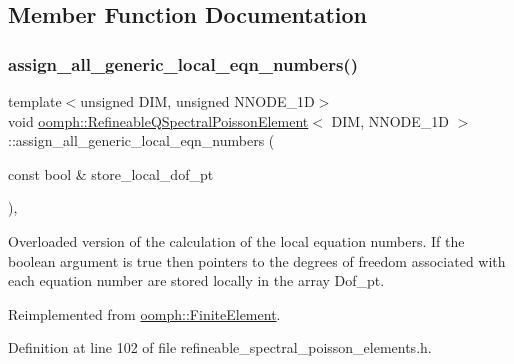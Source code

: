 \subsection{Member Function Documentation}
\mbox{\label{classoomph_1_1RefineableQSpectralPoissonElement_ac6e937b985ab8af65695dd502f48ab43}} 
\subsubsection{\texorpdfstring{assign\+\_\+all\+\_\+generic\+\_\+local\+\_\+eqn\+\_\+numbers()}{assign\_all\_generic\_local\_eqn\_numbers()}}
{\footnotesize\ttfamily template$<$unsigned D\+IM, unsigned N\+N\+O\+D\+E\+\_\+1D$>$ \\
void \hyperlink{classoomph_1_1RefineableQSpectralPoissonElement}{oomph\+::\+Refineable\+Q\+Spectral\+Poisson\+Element}$<$ D\+IM, N\+N\+O\+D\+E\+\_\+1D $>$\+::assign\+\_\+all\+\_\+generic\+\_\+local\+\_\+eqn\+\_\+numbers (\begin{DoxyParamCaption}\item[{const bool \&}]{store\+\_\+local\+\_\+dof\+\_\+pt }\end{DoxyParamCaption})\hspace{0.3cm}{\ttfamily [inline]}, {\ttfamily [virtual]}}



Overloaded version of the calculation of the local equation numbers. If the boolean argument is true then pointers to the degrees of freedom associated with each equation number are stored locally in the array Dof\+\_\+pt. 



Reimplemented from \hyperlink{classoomph_1_1FiniteElement_a564ba080f68132762510b1ec9465b05d}{oomph\+::\+Finite\+Element}.



Definition at line 102 of file refineable\+\_\+spectral\+\_\+poisson\+\_\+elements.\+h.



